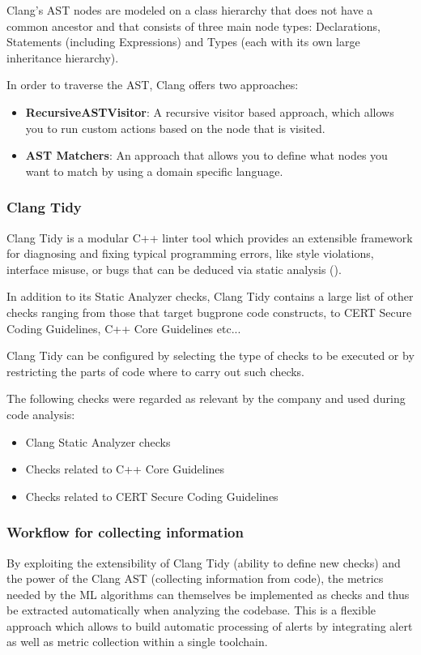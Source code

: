 Clang’s AST nodes are modeled on a class hierarchy that does not have a common ancestor and that consists of three main node types: Declarations, Statements (including Expressions) and Types (each with its own large inheritance hierarchy).

In order to traverse the AST, Clang offers two approaches:
\begin{itemize}
	\item \textbf{RecursiveASTVisitor}: A recursive visitor based approach, which allows you to run custom actions based on the node that is visited.
	\item \textbf{AST Matchers}: An approach that allows you to define what nodes you want to match by using a domain specific language.
\end{itemize}

\subsubsection{Clang Tidy}

Clang Tidy is a modular C++ linter tool which provides an extensible framework for diagnosing and fixing typical programming errors, like style violations, interface misuse, or bugs that can be deduced via static analysis (\cite{clang_tidy}). 

In addition to its Static Analyzer checks, Clang Tidy contains a large list of other checks ranging from those that target bugprone code constructs, to CERT Secure Coding Guidelines, C++ Core Guidelines etc...

Clang Tidy can be configured by selecting the type of checks to be executed or by restricting the parts of code where to carry out such checks.

The following checks were regarded as relevant by the company and used during code analysis:
\begin{itemize}
	\item Clang Static Analyzer checks
	\item Checks related to C++ Core Guidelines
	\item Checks related to CERT Secure Coding Guidelines
\end{itemize}

\subsubsection{Workflow for collecting information \label{data_collection}}

By exploiting the extensibility of Clang Tidy (ability to define new checks) and the power of the Clang AST (collecting information from code), the metrics needed by the ML algorithms can themselves be implemented as checks and thus be extracted automatically when analyzing the codebase. This is a flexible approach which allows to build automatic processing of alerts by integrating alert as well as metric collection within a single toolchain.

